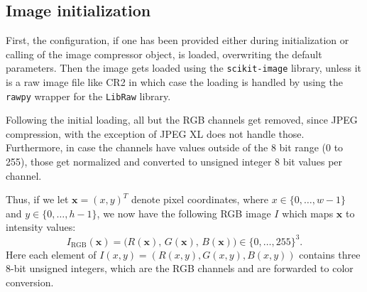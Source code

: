 \subsection{Image initialization}
\label{sec:initialization}
First, the configuration, if one has been provided either during initialization or calling of the image compressor object, is loaded, overwriting the default parameters.
Then the image gets loaded using the \texttt{scikit-image} library, unless it is a raw image file like CR2 in which case the loading is handled by using the \texttt{rawpy} wrapper for the \texttt{LibRaw} library.

Following the initial loading, all but the RGB channels get removed, since JPEG compression, with the exception of JPEG XL does not handle those. Furthermore, in case the channels have values outside of the 8 bit range (0 to 255), those get normalized and converted to unsigned integer 8 bit values per channel.

Thus, if we let  \(\bm{x} = (x,y)^T\) denote pixel coordinates, 
where $x \in \{0, \dots, w-1\}$ and $y \in \{0, \dots, h-1\}$, we now have the following RGB image $I$ which maps $\bm{x}$ to intensity values:
\[
I_{\text{RGB}}(\bm{x}) = \big( R(\bm{x}),\, G(\bm{x}),\, B(\bm{x}) \big) \in \{0, \dots, 255\}^3.
\]
Here each element of \( I(x, y) = (R(x,y), G(x,y), B(x,y)) \) contains three 8-bit unsigned integers, which are the RGB channels and are forwarded to color conversion.


